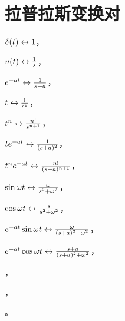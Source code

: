 \documentclass[UTF8]{ctexart}
\begin{document}
\section{拉普拉斯变换对}
  \begin{tabenum}[(1)] \qquad \qquad
    \item $ \delta(t)\leftrightarrow 1 $，
    \item $ u(t)\leftrightarrow \frac{1}{s} $，
    \item $ e^{-at}\leftrightarrow \frac{1}{s+a} $，\\
    \item $ t\leftrightarrow \frac{1}{s^2} $，
    \item $ t^n\leftrightarrow \frac{n!}{s^{n+1}} $，\\
    \item $ t e^{-at}\leftrightarrow \frac{1}{(s+a)^2} $，
    \item $ t^n e^{-at}\leftrightarrow \frac{n!}{(s+a)^{n+1}} $，\\
    \item $ \sin \omega t\leftrightarrow \frac{\omega}{s^2+\omega^2} $，
    \item $ \cos \omega t\leftrightarrow \frac{s}{s^2+\omega^2} $，\\
    \item $ e^{-at}\sin \omega t\leftrightarrow \frac{\omega}{(s+a)^2+\omega^2} $，
    \item $ e^{-at}\cos \omega t\leftrightarrow \frac{s+a}{(s+a)^2+\omega^2} $，\\
    \item $  $，
    \item $  $，\\
    \item $  $。
  \end{tabenum}
\end{document}
